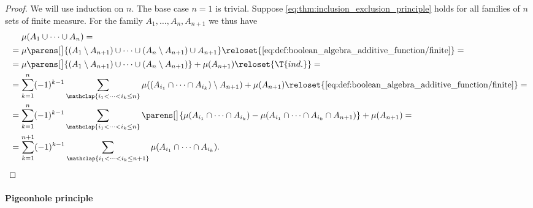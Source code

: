 \begin{proof}
  We will use induction on \( n \). The base case \( n = 1 \) is trivial. Suppose \eqref{eq:thm:inclusion_exclusion_principle} holds for all families of \( n \) sets of finite measure. For the family \( A_1, \ldots, A_n, A_{n+1} \) we thus have
  \begin{align*}
    &\phantom{{}={}}
    \mu(A_1 \cup \cdots \cup A_n)
    = \\ &=
    \mu\parens[\big]{ (A_1 \setminus A_{n+1}) \cup \cdots \cup (A_n \setminus A_{n+1}) \cup A_{n+1} }
    \reloset {\eqref{eq:def:boolean_algebra_additive_function/finite}} = \\ &=
    \mu\parens[\big]{ (A_1 \setminus A_{n+1}) \cup \cdots \cup (A_n \setminus A_{n+1}) } + \mu(A_{n+1})
    \reloset {\T{ind.}} = \\ &=
    \sum_{k=1}^n (-1)^{k - 1} \sum_{\mathclap{i_1 < \cdots < i_k \leq n}} \mu( (A_{i_1} \cap \cdots \cap A_{i_k}) \setminus A_{n+1}) + \mu(A_{n+1})
    \reloset {\eqref{eq:def:boolean_algebra_additive_function/finite}} = \\ &=
    \sum_{k=1}^n (-1)^{k - 1} \sum_{\mathclap{i_1 < \cdots < i_k \leq n}} \parens[\big]{ \mu(A_{i_1} \cap \cdots \cap A_{i_k}) - \mu(A_{i_1} \cap \cdots \cap A_{i_k} \cap A_{n+1}) } + \mu(A_{n+1})
    = \\ &=
    \sum_{k=1}^{n + 1} (-1)^{k - 1} \sum_{\mathclap{i_1 < \cdots < i_k \leq n + 1}} \mu(A_{i_1} \cap \cdots \cap A_{i_k}).
  \end{align*}
\end{proof}

\paragraph{Pigeonhole principle}

